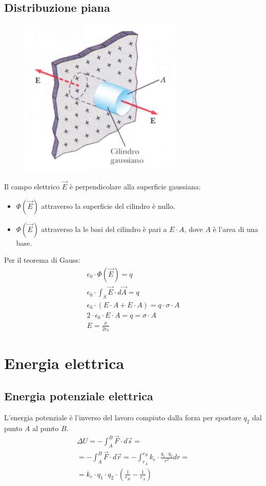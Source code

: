\subsection{Distribuzione piana}
    \begin{figure}[h!]
    	\centering
    	\includegraphics[scale=0.4]{Pictures/esempio4.png}
    \end{figure}
Il campo elettrico $\vec{E}$ è perpendicolare alla superficie gaussiana:
	\begin{itemize}
    	\item{$\Phi(\vec{E})$ attraverso la superficie del cilindro è nullo.}
        \item{$\Phi(\vec{E})$ attraverso la le basi del cilindro è pari a $E \cdot A$, dove $A$ è l'area di una base.}
    \end{itemize}
Per il teorema di Gauss:
	\begin{displaymath}\begin{aligned}
		\epsilon_0 \cdot \Phi(\vec{E}) = q\\
        \epsilon_0 \cdot \int_S \vec{E} \cdot d\vec{A} = q\\
        \epsilon_0 \cdot (E\cdot A + E \cdot A) = q \cdot \sigma \cdot A\\
        2 \cdot \epsilon_0 \cdot E\cdot A = q = \sigma \cdot A\\
        E = \frac{\sigma}{2 \epsilon_0}
	\end{aligned}\end{displaymath}


\section{Energia elettrica}
\subsection{Energia potenziale elettrica}
L'energia potenziale è l'inverso del lavoro compiuto dalla forza per spostare $q_2$ dal punto $A$ al punto $B$.
	\begin{displaymath}\begin{aligned}
		\Delta U = - \int_A^B \vec{F} \cdot d\vec{s} = \\
        = - \int_A^B \vec{F} \cdot d\vec{r} = -\int_{r_A}^{r_B} k_e \cdot \frac{q_1 \cdot q_2}{r^2} dr =\\
        = k_e\cdot q_1 \cdot q_2 \cdot  \left(\frac{1}{r_B} - \frac{1}{r_A}\right)
	\end{aligned}\end{displaymath}

